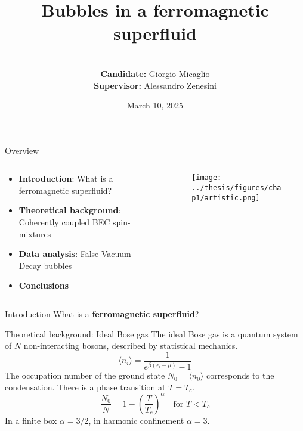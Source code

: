 \documentclass[handout]{beamer}
\title{Bubbles in a ferromagnetic superfluid}
\author{\\\textbf{Candidate:} Giorgio Micaglio\\ \textbf{Supervisor:} Alessandro Zenesini }
\date{March 10, 2025}
\institute{\\~\\Bachelor's Degree in Physics}
\begin{document}
\begin{frame}[plain]
    \maketitle
\end{frame}

\begin{frame}{Overview}
    \begin{columns}
        \begin{column}{0.6\textwidth}
            \begin{itemize}
                \item \textbf{Introduction}: What is a ferromagnetic superfluid?
                \item \textbf{Theoretical background}: Coherently coupled BEC spin-mixtures
                \item \textbf{Data analysis}: False Vacuum Decay bubbles
                \item \textbf{Conclusions}
            \end{itemize}
        \end{column}
        \begin{column}{0.4\textwidth}
            \begin{figure}
                \centering
                \texttt{[image: ../thesis/figures/chap1/artistic.png]}
            \end{figure}
        \end{column}
    \end{columns}
\end{frame}

\begin{frame}{Introduction}
    What is a \textbf{ferromagnetic superfluid}?
\end{frame}


\begin{frame}{Theoretical background: Ideal Bose gas}
    The ideal Bose gas is a quantum system of $N$ non-interacting bosons, described by statistical mechanics.
    \begin{equation*}
        \langle n_i \rangle = \frac{1}{e^{\beta(\epsilon_i - \mu)}-1}
    \end{equation*}
    The occupation number of the ground state $N_0 = \langle n_0\rangle$ corresponds to the condensation. There is a phase transition at $T = T_c$.
    \begin{equation*}
        \frac{N_0}{N} = 1-\left(\frac{T}{T_c}\right)^\alpha \quad \text{for } T < T_c
    \end{equation*}
    In a finite box $\alpha = 3/2$, in harmonic confinement $\alpha = 3$.
\end{frame}
\end{document}
